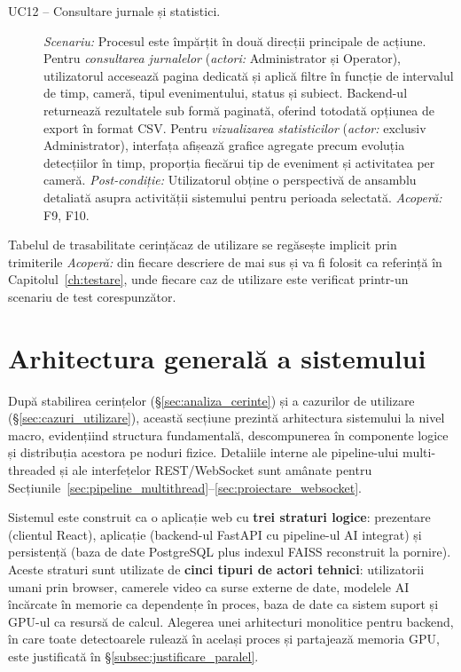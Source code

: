 \documentclass[../../main.tex]{subfiles}
\begin{document}
\begin{description}
    \item[UC12 -- Consultare jurnale și statistici.] \textit{Scenariu:} Procesul este împărțit în două direcții principale de acțiune. Pentru \emph{consultarea jurnalelor} (\textit{actori:} Administrator și Operator), utilizatorul accesează pagina dedicată și aplică filtre în funcție de intervalul de timp, cameră, tipul evenimentului, status și subiect. Backend-ul returnează rezultatele sub formă paginată, oferind totodată opțiunea de export în format CSV. Pentru \emph{vizualizarea statisticilor} (\textit{actor:} exclusiv Administrator), interfața afișează grafice agregate precum evoluția detecțiilor în timp, proporția fiecărui tip de eveniment și activitatea per cameră. \textit{Post-condiție:} Utilizatorul obține o perspectivă de ansamblu detaliată asupra activității sistemului pentru perioada selectată. \textit{Acoperă:} F9, F10.
\end{description}

Tabelul de trasabilitate cerință\textrightarrow caz de utilizare se regăsește implicit prin trimiterile \emph{Acoperă:} din fiecare descriere de mai sus și va fi folosit ca referință în Capitolul~\ref{ch:testare}, unde fiecare caz de utilizare este verificat printr-un scenariu de test corespunzător.

\section{Arhitectura generală a sistemului}
\label{sec:arhitectura_generala}

După stabilirea cerințelor (\S\ref{sec:analiza_cerinte}) și a cazurilor de utilizare (\S\ref{sec:cazuri_utilizare}), această secțiune prezintă arhitectura sistemului la nivel macro, evidențiind structura fundamentală, descompunerea în componente logice și distribuția acestora pe noduri fizice. Detaliile interne ale pipeline-ului multi-threaded și ale interfețelor REST/\linebreak WebSocket sunt amânate pentru Secțiunile~\ref{sec:pipeline_multithread}--\ref{sec:proiectare_websocket}.

Sistemul este construit ca o aplicație web cu \textbf{trei straturi logice}: prezentare (clientul React), aplicație (backend-ul FastAPI cu pipeline-ul AI integrat) și persistență (baza de date PostgreSQL plus indexul FAISS reconstruit la pornire). Aceste straturi sunt utilizate de \textbf{cinci tipuri de actori tehnici}: utilizatorii umani prin browser, camerele video ca surse externe de date, modelele AI încărcate în memorie ca dependențe în proces, baza de date ca sistem suport și GPU-ul ca resursă de calcul. Alegerea unei arhitecturi monolitice pentru \linebreak backend, în care toate detectoarele rulează în același proces și partajează memoria GPU, este justificată în \S\ref{subsec:justificare_paralel}.
\end{document}
